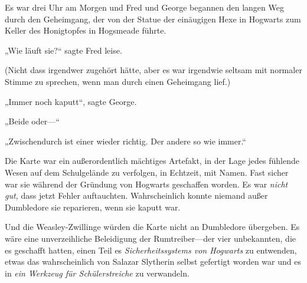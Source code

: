Es war drei Uhr am Morgen und Fred und George begannen den langen Weg durch den Geheimgang, der von der Statue der einäugigen Hexe in Hogwarts zum Keller des Honigtopfes in Hogsmeade führte.

„Wie läuft sie?“ sagte Fred leise.

(Nicht dass irgendwer zugehört hätte, aber es war irgendwie seltsam mit normaler Stimme zu sprechen, wenn man durch einen Geheimgang lief.)

„Immer noch kaputt“, sagte George.

„Beide oder—“

„Zwischendurch ist einer wieder richtig. Der andere so wie immer.“

Die Karte war ein außerordentlich mächtiges Artefakt, in der Lage jedes fühlende Wesen auf dem Schulgelände zu verfolgen, in Echtzeit, mit Namen. Fast sicher war sie während der Gründung von Hogwarts geschaffen worden. Es war \emph{nicht gut,} dass jetzt Fehler auftauchten. Wahrscheinlich konnte niemand außer Dumbledore sie reparieren, wenn sie kaputt war.

Und die Weasley-Zwillinge würden die Karte nicht an Dumbledore übergeben. Es wäre eine unverzeihliche Beleidigung der Rumtreiber—der vier unbekannten, die es geschafft hatten, einen Teil es \emph{Sicherheitssystems von Hogwarts} zu entwenden, etwas das wahrscheinlich von Salazar Slytherin selbst gefertigt worden war und es in \emph{ein Werkzeug für Schülerstreiche} zu verwandeln.

